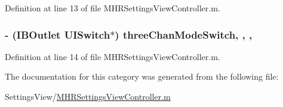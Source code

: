 Definition at line 13 of file M\+H\+R\+Settings\+View\+Controller.\+m.

\hypertarget{category_m_h_r_settings_view_controller_07_08_a1895b1abc4ef23d82293f905fbd27468}{
\subsubsection[{three\+Chan\+Mode\+Switch}]{\setlength{\rightskip}{0pt plus 5cm}-\/ (I\+B\+Outlet U\+I\+Switch$\ast$) three\+Chan\+Mode\+Switch\hspace{0.3cm}{\ttfamily [read]}, {\ttfamily [write]}, {\ttfamily [nonatomic]}, {\ttfamily [weak]}}}\label{category_m_h_r_settings_view_controller_07_08_a1895b1abc4ef23d82293f905fbd27468}


Definition at line 14 of file M\+H\+R\+Settings\+View\+Controller.\+m.



The documentation for this category was generated from the following file\+:\begin{DoxyCompactItemize}
\item 
Settings\+View/\hyperlink{_m_h_r_settings_view_controller_8m}{M\+H\+R\+Settings\+View\+Controller.\+m}\end{DoxyCompactItemize}
